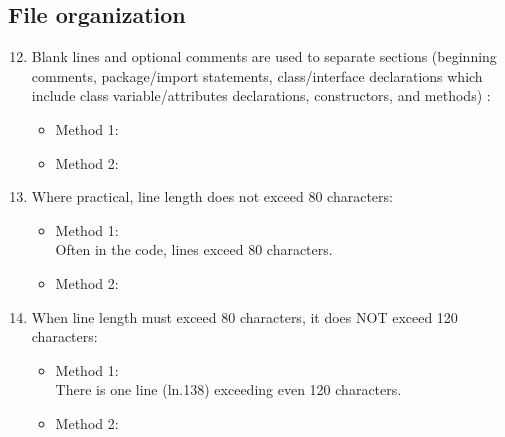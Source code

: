 \subsection{File organization}
\begin{enumerate}
	\setcounter{enumi}{11}
	\item Blank lines and optional comments are used to separate sections (beginning comments, package/import statements, class/interface declarations which include class variable/attributes declarations, constructors, and methods) :
	\begin{itemize}
		\item Method 1: \cmark
		\item Method 2:
	\end{itemize}
	\item Where practical, line length does not exceed 80 characters:
	\begin{itemize}
		\item Method 1: \xmark \\
		Often in the code, lines exceed 80 characters.
		\item Method 2: 
	\end{itemize}
	\item When line length must exceed 80 characters, it does NOT exceed 120 characters:
	\begin{itemize}
		\item Method 1: \xmark \\
		There is one line (ln.138) exceeding even 120 characters.
		\item Method 2: 
	\end{itemize}
\end{enumerate}